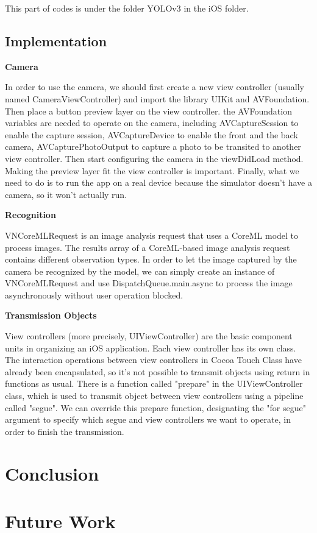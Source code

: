 \documentclass{article}
\begin{document}
This part of codes is under the folder YOLOv3 in the iOS folder.

\subsection{Implementation}

\textbf{Camera}

In order to use the camera, we should first create a new view controller (usually named CameraViewController) and import the library UIKit and AVFoundation. Then place a button preview layer on the view controller. the AVFoundation variables are needed to operate on the camera, including AVCaptureSession to enable the capture session, AVCaptureDevice to enable the front and the back camera, AVCapturePhotoOutput to capture a photo to be transited to another view controller. Then start configuring the camera in the viewDidLoad method. Making the preview layer fit the view controller is important. Finally, what we need to do is to run the app on a real device because the simulator doesn’t have a camera, so it won’t actually run.

\textbf{Recognition}

VNCoreMLRequest is an image analysis request that uses a CoreML model to process images. The results array of a CoreML-based image analysis request contains different observation types. In order to let the image captured by the camera be recognized by the model, we can simply create an instance of VNCoreMLRequest and use DispatchQueue.main.async to process the image asynchronously without user operation blocked.

\textbf{Transmission Objects}

View controllers (more precisely, UIViewController) are the basic component units in organizing an iOS application. Each view controller has its own class. The interaction operations between view controllers in Cocoa Touch Class have already been encapsulated, so it's not possible to transmit objects using return in functions as usual. There is a function called "prepare" in the UIViewController class, which is used to transmit object between view controllers using a pipeline called "segue". We can override this prepare function, designating the "for segue" argument to specify which segue and view controllers we want to operate, in order to finish the transmission.

\section{Conclusion}

\section{Future Work}



\end{document}
